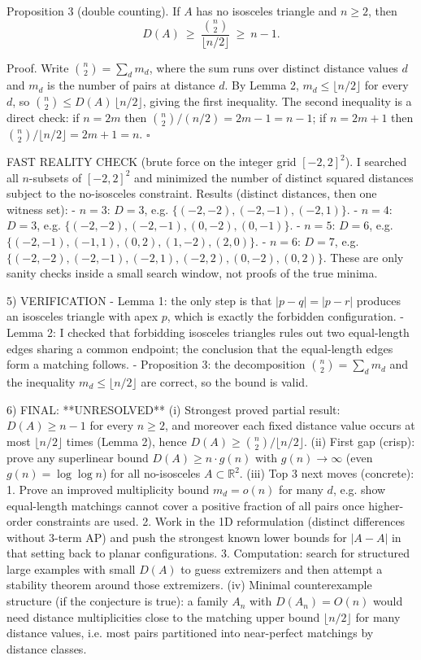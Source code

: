 Proposition 3 (double counting).
If $A$ has no isosceles triangle and $n\ge 2$, then
\[
D(A)\ \ge\ \frac{\binom n2}{\lfloor n/2\rfloor}\ \ge\ n-1.
\]

Proof.
Write $\binom n2=\sum_{d} m_d$, where the sum runs over distinct distance values $d$ and $m_d$
is the number of pairs at distance $d$. By Lemma 2, $m_d\le \lfloor n/2\rfloor$ for every $d$, so
$\binom n2\le D(A)\,\lfloor n/2\rfloor$, giving the first inequality. The second inequality is a direct
check: if $n=2m$ then $\binom n2/(n/2)=2m-1=n-1$; if $n=2m+1$ then $\binom n2/\lfloor n/2\rfloor=2m+1=n$.
$\square$

FAST REALITY CHECK (brute force on the integer grid $[-2,2]^2$).
I searched all $n$-subsets of $[-2,2]^2$ and minimized the number of distinct squared distances subject
to the no-isosceles constraint. Results (distinct distances, then one witness set):
- $n=3$: $D=3$, e.g. $\{(-2,-2), (-2,-1), (-2,1)\}$.
- $n=4$: $D=3$, e.g. $\{(-2,-2), (-2,-1), (0,-2), (0,-1)\}$.
- $n=5$: $D=6$, e.g. $\{(-2,-1), (-1,1), (0,2), (1,-2), (2,0)\}$.
- $n=6$: $D=7$, e.g. $\{(-2,-2), (-2,-1), (-2,1), (-2,2), (0,-2), (0,2)\}$.
These are only sanity checks inside a small search window, not proofs of the true minima.

5) VERIFICATION
- Lemma 1: the only step is that $|p-q|=|p-r|$ produces an isosceles triangle with apex $p$, which is
  exactly the forbidden configuration.
- Lemma 2: I checked that forbidding isosceles triangles rules out two equal-length edges sharing a
  common endpoint; the conclusion that the equal-length edges form a matching follows.
- Proposition 3: the decomposition $\binom n2=\sum_d m_d$ and the inequality $m_d\le\lfloor n/2\rfloor$
  are correct, so the bound is valid.

6) FINAL: **UNRESOLVED**
(i) Strongest proved partial result: $D(A)\ge n-1$ for every $n\ge 2$, and moreover each fixed distance
value occurs at most $\lfloor n/2\rfloor$ times (Lemma 2), hence $D(A)\ge \binom n2/\lfloor n/2\rfloor$.
(ii) First gap (crisp): prove any superlinear bound $D(A)\ge n\cdot g(n)$ with $g(n)\to\infty$ (even
$g(n)=\log\log n$) for all no-isosceles $A\subset\mathbb{R}^2$.
(iii) Top 3 next moves (concrete):
  1. Prove an improved multiplicity bound $m_d=o(n)$ for many $d$, e.g. show equal-length matchings
     cannot cover a positive fraction of all pairs once higher-order constraints are used.
  2. Work in the 1D reformulation (distinct differences without 3-term AP) and push the strongest known
     lower bounds for $|A-A|$ in that setting back to planar configurations.
  3. Computation: search for structured large examples with small $D(A)$ to guess extremizers and then
     attempt a stability theorem around those extremizers.
(iv) Minimal counterexample structure (if the conjecture is true): a family $A_n$ with $D(A_n)=O(n)$
would need distance multiplicities close to the matching upper bound $\lfloor n/2\rfloor$ for many
distance values, i.e. most pairs partitioned into near-perfect matchings by distance classes.


